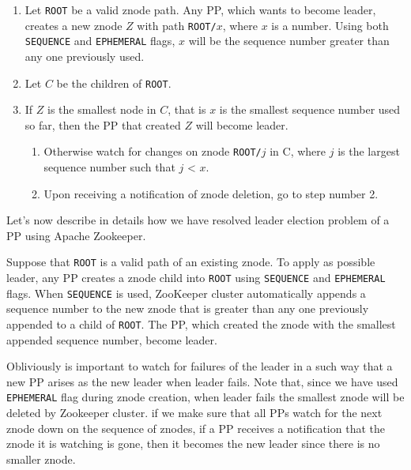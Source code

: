 \documentclass[sigchi]{acmart}
\begin{document}
\begin{algorithm}
\caption{}\label{alg:leaderElection}
\begin{enumerate}

\item Let \texttt{ROOT} be a valid znode path. Any PP, which wants to become leader, creates a new znode $Z$ with path \texttt{ROOT/$x$}, where $x$ is a number. Using both \texttt{SEQUENCE} and \texttt{EPHEMERAL} flags, $x$ will be the sequence number greater than any one previously used.

\item Let $C$ be the children of \texttt{ROOT}. 

\item If $Z$ is the smallest node in $C$, that is $x$ is the smallest sequence number used so far, then the PP that created $Z$ will become leader.

\begin{enumerate}

\item Otherwise watch for changes on znode \texttt{ROOT/$j$} in C, where $j$ is the largest sequence number such that $j$ < $x$.

\item Upon receiving a notification of znode deletion, go to step number 2. 

\end{enumerate}
\end{enumerate}
\end{algorithm}

Let's now describe in details how we have resolved leader election problem of a PP using Apache Zookeeper.

Suppose that \texttt{ROOT} is a valid path of an existing znode. To apply as possible leader, any PP creates a znode child into \texttt{ROOT} using \texttt{SEQUENCE} and \texttt{EPHEMERAL} flags. When \texttt{SEQUENCE} is used, ZooKeeper cluster automatically appends a sequence number to the new znode that is greater than any one previously appended to a child of \texttt{ROOT}. The PP, which created the znode with the smallest appended sequence number, become leader.

Obliviously is important to watch for failures of the leader in a such way that a new PP arises as the new leader when leader fails. Note that, since we have used \texttt{EPHEMERAL} flag during znode creation, when leader fails the smallest znode will be deleted by Zookeeper cluster. if we make sure that all PPs watch for the next znode down on the sequence of znodes, if a PP receives a notification that the znode it is watching is gone, then it becomes the new leader since there is no smaller znode. 
\end{document}
